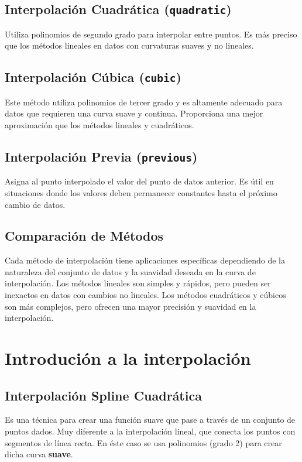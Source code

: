 \documentclass[12pt]{article}
\begin{document}
\subsection{Interpolación Cuadrática (\texttt{quadratic})}
Utiliza polinomios de segundo grado para interpolar entre puntos. 
Es más preciso que los métodos lineales en datos con curvaturas suaves y no lineales.

\subsection{Interpolación Cúbica (\texttt{cubic})}
Este método utiliza polinomios de tercer grado y es altamente adecuado 
para datos que requieren una curva suave y continua. Proporciona una mejor 
aproximación que los métodos lineales y cuadráticos.

\subsection{Interpolación Previa (\texttt{previous})}
Asigna al punto interpolado el valor del punto de datos anterior. Es útil en 
situaciones donde los valores deben permanecer constantes hasta el próximo 
cambio de datos.

\subsection{Comparación de Métodos}
Cada método de interpolación tiene aplicaciones específicas dependiendo de la 
naturaleza del conjunto de datos y la suavidad deseada en la curva de interpolación. 
Los métodos lineales son simples y rápidos, pero pueden ser inexactos en datos 
con cambios no lineales. Los métodos cuadráticos y cúbicos son más complejos, 
pero ofrecen una mayor precisión y suavidad en la interpolación.


\section{Introdución a la interpolación}
  \subsection{Interpolación Spline Cuadrática}
  Es una técnica para crear una función suave que pase a través de un conjunto 
  de puntos dados. Muy diferente a la interpolación lineal, que conecta los puntos 
  con segmentos de línea recta. En éste caso se usa polinomios (grado 2) para crear
  dicha curva \textbf{suave}.\par
\end{document}
